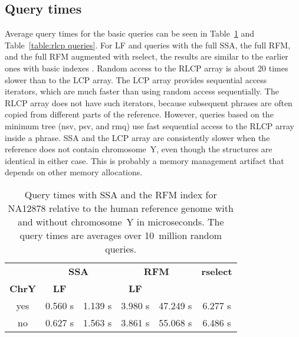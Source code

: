 \documentclass[a4paper,11pt]{llncs}
\newcommand{\SSA}{\textsf{SSA}}
\newcommand{\RFM}{\textsf{RFM}}
\newcommand{\LCP}{\textsf{LCP}}
\newcommand{\RLCP}{\textsf{RLCP}}
\newcommand{\rselect}{\textsf{rselect}}
\newcommand{\LF}{\textsf{LF}}
\newcommand{\Psiop}{\textsf{\textPsi}}
\newcommand{\nsv}{\textsf{nsv}}
\newcommand{\psv}{\textsf{psv}}
\newcommand{\rmq}{\textsf{rmq}}
\newcommand{\mus}{\textmu{}s}
\begin{document}
\subsection{Query times}

Average query times for the basic queries can be seen in Table~\ref{table:rfm queries} and Table~\ref{table:rlcp queries}. For \LF{} and \Psiop{} queries with the full \SSA{}, the full \RFM, and the full \RFM{} augmented with \rselect, the results are similar to the earlier ones with basic indexes \cite{Boucher2015}. Random access to the \RLCP{} array is about 20 times slower than to the \LCP{} array. The \LCP{} array provides sequential access iterators, which are much faster than using random access sequentially. The \RLCP{} array does not have such iterators, because subsequent phrases are often copied from different parts of the reference. However, queries based on the minimum tree (\nsv, \psv, and \rmq) use fast sequential access to the \RLCP{} array inside a phrase. \SSA{} and the \LCP{} array are consistently slower when the reference does not contain chromosome~Y, even though the structures are identical in either case. This is probably a memory management artifact that depends on other memory allocations.

\begin{table}
\caption{Query times with \SSA{} and the \RFM{} index for NA12878 relative to the human reference genome with and without chromosome~Y in microseconds. The query times are averages over 10~million random queries.}\label{table:rfm queries}
\setlength{\extrarowheight}{2pt}
\setlength{\tabcolsep}{3pt}
\begin{center}
\begin{tabular}{c|cc|cc|c}
\hline
 & \multicolumn{2}{c|}{\textbf{\SSA}} & \multicolumn{2}{c|}{\textbf{\RFM}} & \textbf{\rselect} \\
\textbf{ChrY} & \textbf{\LF} & \textbf{\Psiop} & \textbf{\LF} & \textbf{\Psiop} & \textbf{\Psiop} \\
\hline
yes & 0.560 \mus & 1.139 \mus & 3.980 \mus & 47.249 \mus & 6.277 \mus \\
no  & 0.627 \mus & 1.563 \mus & 3.861 \mus & 55.068 \mus & 6.486 \mus \\
\hline
\end{tabular}
\end{center}
\end{table}
\end{document}
